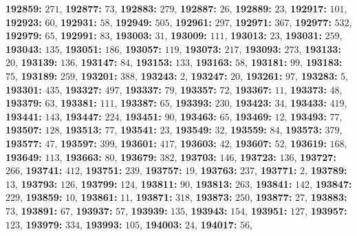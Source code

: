 \textsf{\bfseries 192859:} $271$, \textsf{\bfseries 192877:} $73$, \textsf{\bfseries 192883:} $279$, \textsf{\bfseries 192887:} $26$, \textsf{\bfseries 192889:} $23$, \textsf{\bfseries 192917:} $101$, \textsf{\bfseries 192923:} $60$, \textsf{\bfseries 192931:} $58$, \textsf{\bfseries 192949:} $505$, \textsf{\bfseries 192961:} $297$, \textsf{\bfseries 192971:} $367$, \textsf{\bfseries 192977:} $532$, \textsf{\bfseries 192979:} $65$, \textsf{\bfseries 192991:} $83$, \textsf{\bfseries 193003:} $31$, \textsf{\bfseries 193009:} $111$, \textsf{\bfseries 193013:} $23$, \textsf{\bfseries 193031:} $259$, \textsf{\bfseries 193043:} $135$, \textsf{\bfseries 193051:} $186$, \textsf{\bfseries 193057:} $119$, \textsf{\bfseries 193073:} $217$, \textsf{\bfseries 193093:} $273$, \textsf{\bfseries 193133:} $20$, \textsf{\bfseries 193139:} $136$, \textsf{\bfseries 193147:} $84$, \textsf{\bfseries 193153:} $133$, \textsf{\bfseries 193163:} $58$, \textsf{\bfseries 193181:} $99$, \textsf{\bfseries 193183:} $75$, \textsf{\bfseries 193189:} $259$, \textsf{\bfseries 193201:} $388$, \textsf{\bfseries 193243:} $2$, \textsf{\bfseries 193247:} $20$, \textsf{\bfseries 193261:} $97$, \textsf{\bfseries 193283:} $5$, \textsf{\bfseries 193301:} $435$, \textsf{\bfseries 193327:} $497$, \textsf{\bfseries 193337:} $79$, \textsf{\bfseries 193357:} $72$, \textsf{\bfseries 193367:} $11$, \textsf{\bfseries 193373:} $48$, \textsf{\bfseries 193379:} $63$, \textsf{\bfseries 193381:} $111$, \textsf{\bfseries 193387:} $65$, \textsf{\bfseries 193393:} $230$, \textsf{\bfseries 193423:} $34$, \textsf{\bfseries 193433:} $419$, \textsf{\bfseries 193441:} $143$, \textsf{\bfseries 193447:} $224$, \textsf{\bfseries 193451:} $90$, \textsf{\bfseries 193463:} $65$, \textsf{\bfseries 193469:} $12$, \textsf{\bfseries 193493:} $77$, \textsf{\bfseries 193507:} $128$, \textsf{\bfseries 193513:} $77$, \textsf{\bfseries 193541:} $23$, \textsf{\bfseries 193549:} $32$, \textsf{\bfseries 193559:} $84$, \textsf{\bfseries 193573:} $379$, \textsf{\bfseries 193577:} $47$, \textsf{\bfseries 193597:} $399$, \textsf{\bfseries 193601:} $417$, \textsf{\bfseries 193603:} $42$, \textsf{\bfseries 193607:} $52$, \textsf{\bfseries 193619:} $168$, \textsf{\bfseries 193649:} $113$, \textsf{\bfseries 193663:} $80$, \textsf{\bfseries 193679:} $382$, \textsf{\bfseries 193703:} $146$, \textsf{\bfseries 193723:} $136$, \textsf{\bfseries 193727:} $266$, \textsf{\bfseries 193741:} $412$, \textsf{\bfseries 193751:} $239$, \textsf{\bfseries 193757:} $19$, \textsf{\bfseries 193763:} $237$, \textsf{\bfseries 193771:} $2$, \textsf{\bfseries 193789:} $13$, \textsf{\bfseries 193793:} $126$, \textsf{\bfseries 193799:} $124$, \textsf{\bfseries 193811:} $90$, \textsf{\bfseries 193813:} $263$, \textsf{\bfseries 193841:} $142$, \textsf{\bfseries 193847:} $229$, \textsf{\bfseries 193859:} $10$, \textsf{\bfseries 193861:} $11$, \textsf{\bfseries 193871:} $318$, \textsf{\bfseries 193873:} $250$, \textsf{\bfseries 193877:} $27$, \textsf{\bfseries 193883:} $73$, \textsf{\bfseries 193891:} $67$, \textsf{\bfseries 193937:} $57$, \textsf{\bfseries 193939:} $135$, \textsf{\bfseries 193943:} $154$, \textsf{\bfseries 193951:} $127$, \textsf{\bfseries 193957:} $123$, \textsf{\bfseries 193979:} $334$, \textsf{\bfseries 193993:} $105$, \textsf{\bfseries 194003:} $24$, \textsf{\bfseries 194017:} $56$, 

